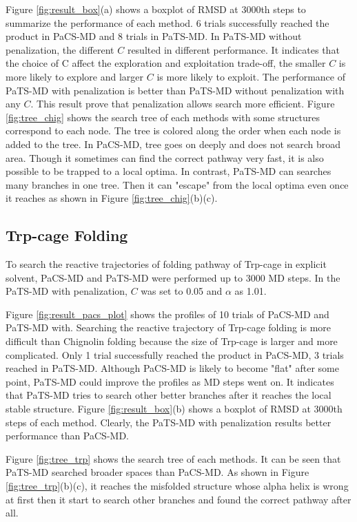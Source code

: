 Figure \ref{fig:result_box}(a) shows a boxplot of RMSD at 3000th steps to summarize the performance of each method. 6 trials successfully reached the product in PaCS-MD and 8 trials in PaTS-MD. In PaTS-MD without penalization, the different $C$ resulted in different performance. It indicates that the choice of C affect the exploration and exploitation trade-off, the smaller $C$ is more likely to explore and larger $C$ is more likely to exploit. The performance of PaTS-MD with penalization is better than PaTS-MD without penalization with any $C$. This result prove that penalization allows search more efficient.
Figure \ref{fig:tree_chig} shows the search tree of each methods with some structures correspond to each node. The tree is colored along the order when each node is added to the tree.
In PaCS-MD, tree goes on deeply and does not search broad area. Though it sometimes can find the correct pathway very fast, it is also possible to be trapped to a local optima. In contrast, PaTS-MD can searches many branches in one tree. Then it can "escape" from the local optima even once it reaches as shown in Figure \ref{fig:tree_chig}(b)(c).

\subsection{Trp-cage Folding}
To search the reactive trajectories of folding pathway of Trp-cage in explicit solvent, PaCS-MD and PaTS-MD were performed up to 3000 MD steps. In the PaTS-MD with penalization, $C$ was set to 0.05 and $\alpha$ as 1.01.

Figure \ref{fig:result_pacs_plot} shows the profiles of 10 trials of PaCS-MD and PaTS-MD with. Searching the reactive trajectory of Trp-cage folding is more difficult than Chignolin folding because the size of Trp-cage is larger and more complicated. Only 1 trial successfully reached the product in PaCS-MD, 3 trials reached in PaTS-MD. Although PaCS-MD is likely to become "flat" after some point, PaTS-MD could improve the profiles as MD steps went on. It indicates that PaTS-MD tries to search other better branches after it reaches the local stable structure. 
Figure \ref{fig:result_box}(b) shows a boxplot of RMSD at 3000th steps of each method. Clearly, the PaTS-MD with penalization results better performance than PaCS-MD. 

Figure \ref{fig:tree_trp} shows the search tree of each methods. It can be seen that PaTS-MD searched broader spaces than PaCS-MD. As shown in Figure \ref{fig:tree_trp}(b)(c), it reaches the misfolded structure whose alpha helix is wrong at first then it start to search other branches and found the correct pathway after all. 

